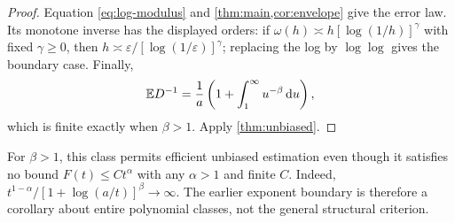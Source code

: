 \begin{proof}
Equation \eqref{eq:log-modulus} and \cref{thm:main,cor:envelope} give the
error law. Its monotone inverse has the displayed orders: if
$\omega(h)\asymp h[\log(1/h)]^\gamma$ with fixed $\gamma\ge0$, then
$h\asymp\varepsilon/[\log(1/\varepsilon)]^\gamma$; replacing the log by
$\log\log$ gives the boundary case. Finally,
\[
 \mathbb E D^{-1}=\frac1a\left(1+\int_1^\infty u^{-\beta}\,\mathrm du\right),
\]
which is finite exactly when $\beta>1$. Apply \cref{thm:unbiased}.
\end{proof}

For $\beta>1$, this class permits efficient unbiased estimation even
though it satisfies no bound $F(t)\le C t^\alpha$ with any $\alpha>1$ and
finite $C$. Indeed, $t^{1-\alpha}/[1+\log(a/t)]^\beta\to\infty$.
The earlier exponent boundary is therefore a corollary about entire
polynomial classes, not the general structural criterion.

